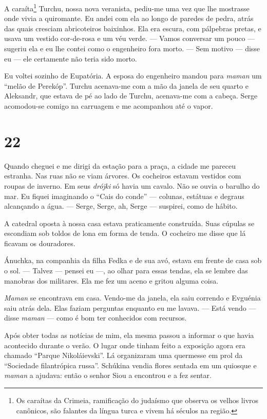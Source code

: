 A caraíta\footnote{Os caraítas da Crimeia, ramificação do judaísmo que
  observa os velhos livros canônicos, são falantes da língua turca e
  vivem há séculos na região.} Turchu, nossa nova veranista, pediu-me
uma vez que lhe mostrasse onde vivia a quiromante. Eu andei com ela ao
longo de paredes de pedra, atrás das quais cresciam abricoteiros
baixinhos. Ela era escura, com pálpebras pretas, e usava um vestido
cor-de-rosa e um véu verde. --- Vamos conversar um pouco --- sugeriu ela
e eu lhe contei como o engenheiro fora morto. --- Sem motivo --- disse
eu --- ele certamente não teria sido morto.

Eu voltei sozinho de Eupatória. A esposa do engenheiro mandou para
\emph{maman} um ``melão de Perekóp''. Turchu acenava-me com a mão da
janela de seu quarto e Aleksandr, que estava de pé ao lado de Turchu,
acenava-me com a cabeça. Serge acomodou-se comigo na carruagem e me
acompanhou até o vapor.

\section{22}

Quando cheguei e me dirigi da estação para a praça, a cidade me pareceu
estranha. Nas ruas não se viam árvores. Os cocheiros estavam vestidos
com roupas de inverno. Em seus \emph{drójki} só havia um cavalo. Não se
ouvia o barulho do mar. Eu fiquei imaginando o ``Cais do conde'' ---
colunas, estátuas e degraus alcançando a água. --- Serge, Serge, ah,
Serge --- suspirei, como de hábito.

A catedral oposta à nossa casa estava praticamente construída. Suas
cúpulas se escondiam sob toldos de lona em forma de tenda. O cocheiro me
disse que lá ficavam os douradores.

Ánuchka, na companhia da filha Fedka e de sua avó, estava em frente de
casa sob o sol. --- Talvez --- pensei eu ---, ao olhar para essas
tendas, ela se lembre das manobras dos militares. Ela me fez um aceno e
gritou alguma coisa.

\emph{Maman} se encontrava em casa. Vendo-me da janela, ela saiu
correndo e Evguénia saiu atrás dela. Elas faziam perguntas enquanto eu
me lavava. --- Está vendo --- disse \emph{maman} --- como é bom ter
conhecidos com recursos.

Após obter todas as notícias de mim, ela mesma passou a informar o que
havia acontecido durante o verão. O lugar onde tinham feito a exposição
agora era chamado ``Parque Nikoláievski''. Lá organizaram uma quermesse
em prol da ``Sociedade filantrópica russa''. Schúkina vendia flores
sentada em um quiosque e \emph{maman} a ajudava: então o senhor Siou a
encontrou e a fez sentar.

